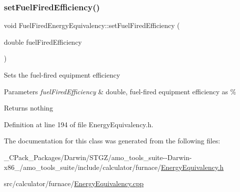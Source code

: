 \subsubsection{\texorpdfstring{set\+Fuel\+Fired\+Efficiency()}{setFuelFiredEfficiency()}\hspace{0.1cm}{\footnotesize\ttfamily [3/3]}}
{\footnotesize\ttfamily void Fuel\+Fired\+Energy\+Equivalency\+::set\+Fuel\+Fired\+Efficiency (\begin{DoxyParamCaption}\item[{double}]{fuel\+Fired\+Efficiency }\end{DoxyParamCaption})\hspace{0.3cm}{\ttfamily [inline]}}

Sets the fuel-\/fired equipment efficiency


\begin{DoxyParams}{Parameters}
{\em fuel\+Fired\+Efficiency} & double, fuel-\/fired equipment efficiency as \%\\
\hline
\end{DoxyParams}
\begin{DoxyReturn}{Returns}
nothing 
\end{DoxyReturn}


Definition at line 194 of file Energy\+Equivalency.\+h.



The documentation for this class was generated from the following files\+:\begin{DoxyCompactItemize}
\item 
\+\_\+\+C\+Pack\+\_\+\+Packages/\+Darwin/\+S\+T\+G\+Z/amo\+\_\+tools\+\_\+suite-\/-\/\+Darwin-\/x86\+\_/amo\+\_\+tools\+\_\+suite/include/calculator/furnace/\hyperlink{___c_pack___packages_2_darwin_2_s_t_g_z_2amo__tools__suite--_darwin-x86__64_2amo__tools__suite_22deb35937168994abc5651756c82123a}{Energy\+Equivalency.\+h}\item 
src/calculator/furnace/\hyperlink{_energy_equivalency_8cpp}{Energy\+Equivalency.\+cpp}\end{DoxyCompactItemize}
